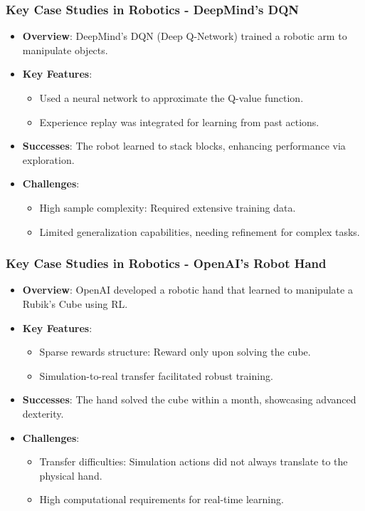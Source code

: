 \documentclass[aspectratio=169]{beamer}
\begin{document}
\begin{frame}[fragile]
    \frametitle{Key Case Studies in Robotics - DeepMind's DQN}
    \begin{itemize}
        \item \textbf{Overview}: DeepMind's DQN (Deep Q-Network) trained a robotic arm to manipulate objects.
        \item \textbf{Key Features}:
            \begin{itemize}
                \item Used a neural network to approximate the Q-value function.
                \item Experience replay was integrated for learning from past actions.
            \end{itemize}
        \item \textbf{Successes}: The robot learned to stack blocks, enhancing performance via exploration.
        \item \textbf{Challenges}:
            \begin{itemize}
                \item High sample complexity: Required extensive training data.
                \item Limited generalization capabilities, needing refinement for complex tasks.
            \end{itemize}
    \end{itemize}
\end{frame}

\begin{frame}[fragile]
    \frametitle{Key Case Studies in Robotics - OpenAI's Robot Hand}
    \begin{itemize}
        \item \textbf{Overview}: OpenAI developed a robotic hand that learned to manipulate a Rubik's Cube using RL.
        \item \textbf{Key Features}:
            \begin{itemize}
                \item Sparse rewards structure: Reward only upon solving the cube.
                \item Simulation-to-real transfer facilitated robust training.
            \end{itemize}
        \item \textbf{Successes}: The hand solved the cube within a month, showcasing advanced dexterity.
        \item \textbf{Challenges}:
            \begin{itemize}
                \item Transfer difficulties: Simulation actions did not always translate to the physical hand.
                \item High computational requirements for real-time learning.
            \end{itemize}
    \end{itemize}
\end{frame}
\end{document}
